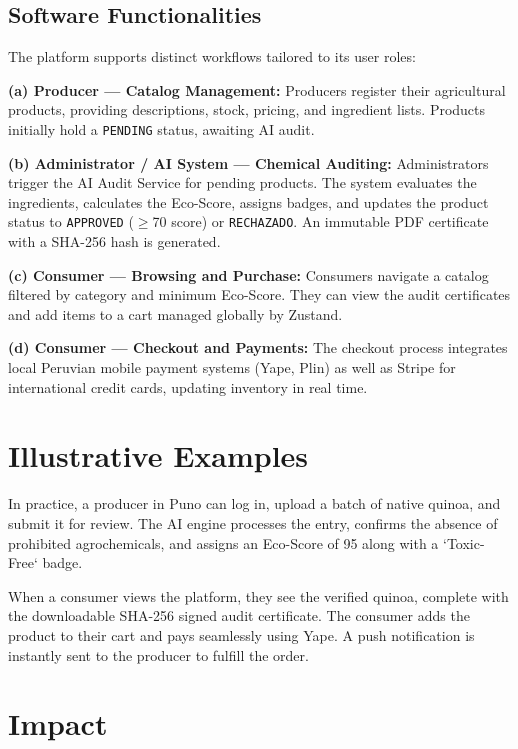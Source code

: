 \documentclass[preprint,12pt,a4paper]{elsarticle}
\begin{document}
\subsection{Software Functionalities}

The platform supports distinct workflows tailored to its user roles:

\textbf{(a) Producer — Catalog Management:} Producers register their agricultural products, providing descriptions, stock, pricing, and ingredient lists. Products initially hold a \texttt{PENDING} status, awaiting AI audit.

\textbf{(b) Administrator / AI System — Chemical Auditing:} Administrators trigger the AI Audit Service for pending products. The system evaluates the ingredients, calculates the Eco-Score, assigns badges, and updates the product status to \texttt{APPROVED} ($\geq$70 score) or \texttt{RECHAZADO}. An immutable PDF certificate with a SHA-256 hash is generated.

\textbf{(c) Consumer — Browsing and Purchase:} Consumers navigate a catalog filtered by category and minimum Eco-Score. They can view the audit certificates and add items to a cart managed globally by Zustand.

\textbf{(d) Consumer — Checkout and Payments:} The checkout process integrates local Peruvian mobile payment systems (Yape, Plin) as well as Stripe for international credit cards, updating inventory in real time.

\section{Illustrative Examples}

In practice, a producer in Puno can log in, upload a batch of native quinoa, and submit it for review. The AI engine processes the entry, confirms the absence of prohibited agrochemicals, and assigns an Eco-Score of 95 along with a `Toxic-Free` badge. 

When a consumer views the platform, they see the verified quinoa, complete with the downloadable SHA-256 signed audit certificate. The consumer adds the product to their cart and pays seamlessly using Yape. A push notification is instantly sent to the producer to fulfill the order.

\section{Impact}
\end{document}
